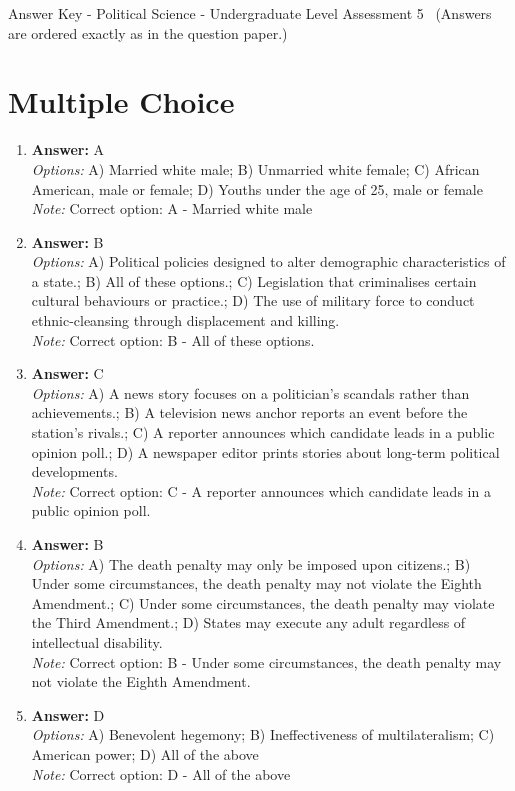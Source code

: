 \documentclass[12pt]{article}
\begin{document}
\begin{center}
Answer Key - Political Science - Undergraduate Level Assessment 5 \
\small (Answers are ordered exactly as in the question paper.)
\end{center}

\section*{Multiple Choice}
\begin{enumerate}[label=\arabic*.]
\item \textbf{Answer:} A
\\ \textit{Options:} A) Married white male; B) Unmarried white female; C) African American, male or female; D) Youths under the age of 25, male or female
\\ \textit{Note:} Correct option: A - Married white male
\item \textbf{Answer:} B
\\ \textit{Options:} A) Political policies designed to alter demographic characteristics of a state.; B) All of these options.; C) Legislation that criminalises certain cultural behaviours or practice.; D) The use of military force to conduct ethnic-cleansing through displacement and killing.
\\ \textit{Note:} Correct option: B - All of these options.
\item \textbf{Answer:} C
\\ \textit{Options:} A) A news story focuses on a politician's scandals rather than achievements.; B) A television news anchor reports an event before the station's rivals.; C) A reporter announces which candidate leads in a public opinion poll.; D) A newspaper editor prints stories about long-term political developments.
\\ \textit{Note:} Correct option: C - A reporter announces which candidate leads in a public opinion poll.
\item \textbf{Answer:} B
\\ \textit{Options:} A) The death penalty may only be imposed upon citizens.; B) Under some circumstances, the death penalty may not violate the Eighth Amendment.; C) Under some circumstances, the death penalty may violate the Third Amendment.; D) States may execute any adult regardless of intellectual disability.
\\ \textit{Note:} Correct option: B - Under some circumstances, the death penalty may not violate the Eighth Amendment.
\item \textbf{Answer:} D
\\ \textit{Options:} A) Benevolent hegemony; B) Ineffectiveness of multilateralism; C) American power; D) All of the above
\\ \textit{Note:} Correct option: D - All of the above
\end{enumerate}
\end{document}
